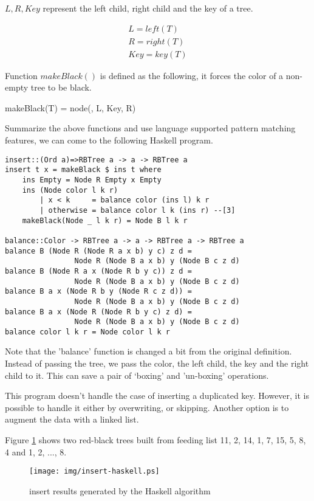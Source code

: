\documentclass{article}
\begin{document}
$L, R, Key$ represent the left child, right child and the key of a tree.

\[
  \begin{array}{l}
  L = left(T) \\
  R = right(T) \\
  Key = key(T)
  \end{array}
\]


Function $makeBlack()$ is defined as the following, it forces the color
of a non-empty tree to be black.

\be
makeBlack(T) = node(, L, Key, R)
\ee

Summarize the above functions and use language supported pattern matching
features, we can come to the following Haskell program.

\lstset{language=Haskell}
\begin{lstlisting}
insert::(Ord a)=>RBTree a -> a -> RBTree a
insert t x = makeBlack $ ins t where
    ins Empty = Node R Empty x Empty
    ins (Node color l k r)
        | x < k     = balance color (ins l) k r
        | otherwise = balance color l k (ins r) --[3]
    makeBlack(Node _ l k r) = Node B l k r

balance::Color -> RBTree a -> a -> RBTree a -> RBTree a
balance B (Node R (Node R a x b) y c) z d =
                Node R (Node B a x b) y (Node B c z d)
balance B (Node R a x (Node R b y c)) z d =
                Node R (Node B a x b) y (Node B c z d)
balance B a x (Node R b y (Node R c z d)) =
                Node R (Node B a x b) y (Node B c z d)
balance B a x (Node R (Node R b y c) z d) =
                Node R (Node B a x b) y (Node B c z d)
balance color l k r = Node color l k r
\end{lstlisting} %

Note that the 'balance' function is changed a bit from the original
definition. Instead of passing the tree, we pass
the color, the left child, the key and the right child to it.
This can save a pair of `boxing' and 'un-boxing' operations.

This program doesn't handle the case of inserting a duplicated key.
However, it is possible to handle it either by overwriting,
or skipping. Another option is to augment the data with a linked
list\cite{CLRS}.

Figure \ref{fig:insert-example} shows two red-black trees
built from feeding list 11, 2, 14, 1, 7, 15, 5, 8, 4 and 1, 2, ..., 8.

\begin{figure}[htbp]
  \centering
  \texttt{[image: img/insert-haskell.ps]}
  \caption{insert results generated by the Haskell algorithm} \label{fig:insert-example}
\end{figure}
\end{document}
